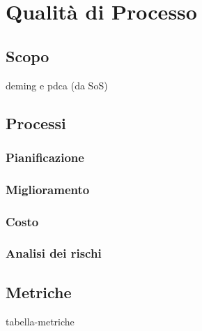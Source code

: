 \chapter{Qualità di Processo}
\label{processo}
\section{Scopo}
deming e pdca (da SoS)

\section{Processi}
\subsection{Pianificazione}

\subsection{Miglioramento}

\subsection{Costo}

\subsection{Analisi dei rischi}

\section{Metriche}
tabella-metriche